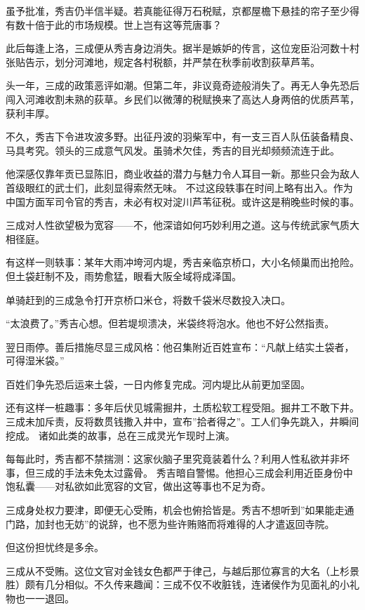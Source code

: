 \documentclass[
]{book}
\begin{document}
虽予批准，秀吉仍半信半疑。若真能征得万石税赋，京都屋檐下悬挂的帘子至少得有数十倍于此的市场规模。世上岂有这等荒唐事？

此后每逢上洛，三成便从秀吉身边消失。据半是嫉妒的传言，这位宠臣沿河数十村张贴告示，划分河滩地，规定各村税额，并严禁在秋季前收割荻草芦苇。

头一年，三成的政策恶评如潮。但第二年，非议竟奇迹般消失了。再无人争先恐后闯入河滩收割未熟的荻草。乡民们以微薄的税赋换来了高达人身两倍的优质芦苇，获利丰厚。

不久，秀吉下令进攻波多野。出征丹波的羽柴军中，有一支三百人队伍装备精良、马具考究。领头的三成意气风发。虽骑术欠佳，秀吉的目光却频频流连于此。

他深感仅靠年贡已显陈旧，商业收益的潜力与魅力令人耳目一新。那些只会为敌人首级眼红的武士们，此刻显得索然无味。
不过这段轶事在时间上略有出入。作为中国方面军司令官的秀吉，未必有权对淀川芦苇征税。或许这是稍晚些时候的事。

三成对人性欲望极为宽容------不，他深谙如何巧妙利用之道。这与传统武家气质大相径庭。

有这样一则轶事：某年大雨冲垮河内堤，秀吉亲临京桥口，大小名倾巢而出抢险。但土袋赶制不及，雨势愈猛，眼看大阪全域将成泽国。

单骑赶到的三成急令打开京桥口米仓，将数千袋米尽数投入决口。

``太浪费了。''秀吉心想。但若堤坝溃决，米袋终将泡水。他也不好公然指责。

翌日雨停。善后措施尽显三成风格：他召集附近百姓宣布：``凡献上结实土袋者，可得湿米袋。''

百姓们争先恐后运来土袋，一日内修复完成。河内堤比从前更加坚固。

还有这样一桩趣事：多年后伏见城需掘井，土质松软工程受阻。掘井工不敢下井。三成未加斥责，反将数贯钱撒入井中，宣布''拾者得之''。工人们争先跳入，井瞬间挖成。
诸如此类的故事，总在三成灵光乍现时上演。

每每此时，秀吉都不禁揣测：这家伙脑子里究竟装着什么？利用人性私欲并非坏事，但三成的手法未免太过露骨。
秀吉暗自警惕。他担心三成会利用近臣身份中饱私囊------对私欲如此宽容的文官，做出这等事也不足为奇。

三成身处权力要津，即便无心受贿，机会也俯拾皆是。秀吉不想听到''如果能走通门路，加封也无妨''的说辞，也不愿为些许贿赂而将难得的人才遣返回寺院。

但这份担忧终是多余。

三成从不受贿。这位文官对金钱女色都严于律己，与越后那位寡言的大名（上杉景胜）颇有几分相似。不久传来趣闻：三成不仅不收脏钱，连诸侯作为见面礼的小礼物也一一退回。
\end{document}
